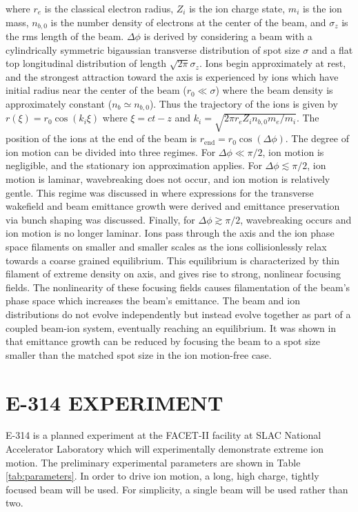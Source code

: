 \documentclass{aac}
\begin{document}
\noindent where $r_e$ is the classical electron radius, $Z_i$ is the ion charge state, $m_i$ is the ion mass, $n_{b,0}$ is the number density of electrons at the center of the beam, and $\sigma_z$ is the rms length of the beam. $\Delta \phi$ is derived by considering a beam with a cylindrically symmetric bigaussian transverse distribution of spot size $\sigma$ and a flat top longitudinal distribution of length $\sqrt{2 \pi} \sigma_z$. Ions begin approximately at rest, and the strongest attraction toward the axis is experienced by ions which have initial radius near the center of the beam ($r_0 \ll \sigma$) where the beam density is approximately constant ($n_b \simeq n_{b,0}$). Thus the trajectory of the ions is given by $r(\xi) = r_0 \cos(k_i \xi)$ where $\xi = ct - z$ and $k_i = \sqrt{2 \pi r_e Z_i n_{b,0} m_e / m_i}$. The position of the ions at the end of the beam is $r_{\text{end}} = r_0 \cos(\Delta \phi)$. The degree of ion motion can be divided into three regimes. For $\Delta \phi \ll \pi / 2$, ion motion is negligible, and the stationary ion approximation applies. For $\Delta \phi \lesssim \pi / 2$, ion motion is laminar, wavebreaking does not occur, and ion motion is relatively gentle. This regime was discussed in \cite{benedetti1} where expressions for the transverse wakefield and beam emittance growth were derived and emittance preservation via bunch shaping was discussed. Finally, for $\Delta \phi \gtrsim \pi / 2$, wavebreaking occurs and ion motion is no longer laminar. Ions pass through the axis and the ion phase space filaments on smaller and smaller scales as the ions collisionlessly relax towards a coarse grained equilibrium. This equilibrium is characterized by thin filament of extreme density on axis, and gives rise to strong, nonlinear focusing fields. The nonlinearity of these focusing fields causes filamentation of the beam's phase space which increases the beam's emittance. The beam and ion distributions do not evolve independently but instead evolve together as part of a coupled beam-ion system, eventually reaching an equilibrium. It was shown in \cite{an} that emittance growth can be reduced by focusing the beam to a spot size smaller than the matched spot size in the ion motion-free case. 

\section{E-314 EXPERIMENT}

E-314 is a planned experiment at the FACET-II facility at SLAC National Accelerator Laboratory which will experimentally demonstrate extreme ion motion. The preliminary experimental parameters are shown in Table \ref{tab:parameters}. In order to drive ion motion, a long, high charge, tightly focused beam will be used. For simplicity, a single beam will be used rather than two.
\end{document}
